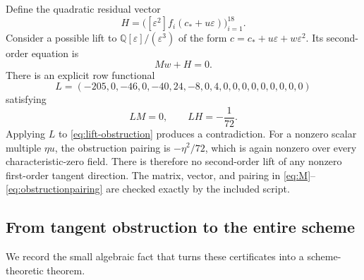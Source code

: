 \documentclass[11pt,a4paper]{article}
\numberwithin{equation}{section}
\theoremstyle{definition}
\theoremstyle{remark}
\newcommand{\Q}{\mathbb{Q}}
\newcommand{\cstar}{c_*}
\newcommand{\eps}{\varepsilon}
\begin{document}
Define the quadratic residual vector
\begin{equation}\label{eq:H}
H=\bigl([\eps^2]f_i(\cstar+u\eps)\bigr)_{i=1}^{18}.
\end{equation}
Consider a possible lift to $\Q[\eps]/(\eps^3)$ of the form
$c=\cstar+u\eps+w\eps^2$. Its second-order equation is
\begin{equation}\label{eq:lift-obstruction}
Mw+H=0.
\end{equation}
There is an explicit row functional
\begin{equation}\label{eq:ell}
L=(-205,0,-46,0,-40,24,-8,0,4,0,0,0,0,0,0,0,0,0)
\end{equation}
satisfying
\begin{equation}\label{eq:obstructionpairing}
LM=0,\qquad LH=-\frac1{72}.
\end{equation}
Applying $L$ to \eqref{eq:lift-obstruction} produces a contradiction.
For a nonzero scalar multiple $\eta u$, the obstruction pairing is
$-\eta^2/72$, which is again nonzero over every characteristic-zero field.
There is therefore no second-order lift of any nonzero first-order tangent
direction. The matrix, vector, and pairing in
\eqref{eq:M}--\eqref{eq:obstructionpairing} are checked exactly by the
included script.

\subsection{From tangent obstruction to the entire scheme}

We record the small algebraic fact that turns these certificates into a
scheme-theoretic theorem.
\end{document}
